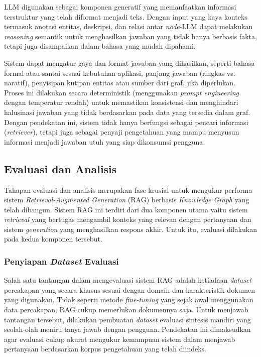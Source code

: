 LLM digunakan sebagai komponen generatif yang memanfaatkan informasi terstruktur yang telah diformat menjadi teks.
Dengan input yang kaya konteks termasuk anotasi entitas, deskripsi, dan relasi antar \textit{node}-LLM dapat melakukan \textit{reasoning} semantik untuk menghasilkan jawaban yang tidak hanya berbasis fakta, tetapi juga disampaikan dalam bahasa yang mudah dipahami.

Sistem dapat mengatur gaya dan format jawaban yang dihasilkan, seperti bahasa formal atau santai sesuai kebutuhan aplikasi, panjang jawaban (ringkas vs. naratif), penyisipan kutipan entitas atau sumber dari graf, jika diperlukan.
Proses ini dilakukan secara deterministik (menggunakan \textit{prompt engineering} dengan temperatur rendah) untuk memastikan konsistensi dan menghindari halusinasi jawaban yang tidak berdasarkan pada data yang tersedia dalam graf.
Dengan pendekatan ini, sistem tidak hanya berfungsi sebagai pencari informasi (\textit{retriever}), tetapi juga sebagai penyaji pengetahuan yang mampu menyusun informasi menjadi jawaban utuh yang siap dikonsumsi pengguna.

\subsection{Evaluasi dan Analisis}
Tahapan evaluasi dan analisis merupakan fase krusial untuk mengukur performa sistem \textit{Retrieval-Augmented Generation} (RAG) berbasis \textit{Knowledge Graph} yang telah dibangun.
Sistem RAG ini terdiri dari dua komponen utama yaitu sistem \textit{retrieval} yang bertugas mengambil konteks yang relevan dengan pertanyaan dan sistem \textit{generation} yang menghasilkan respons akhir.
Untuk itu, evaluasi dilakukan pada kedua komponen tersebut.

\subsubsection{Penyiapan \textit{Dataset} Evaluasi}
Salah satu tantangan dalam mengevaluasi sistem RAG adalah ketiadaan \textit{dataset} percakapan yang secara khusus sesuai dengan domain dan karakteristik dokumen yang digunakan.
Tidak seperti metode \textit{fine-tuning} yang sejak awal menggunakan data percakapan, RAG cukup memerlukan dokumennya saja.
Untuk menjawab tantangan tersebut, dilakukan pembuatan \textit{dataset} evaluasi sintesis mandiri yang seolah-olah meniru tanya jawab dengan pengguna.
Pendekatan ini dimaksudkan agar evaluasi cukup akurat mengukur kemampuan sistem dalam menjawab pertanyaan berdasarkan korpus pengetahuan yang telah diindeks.

